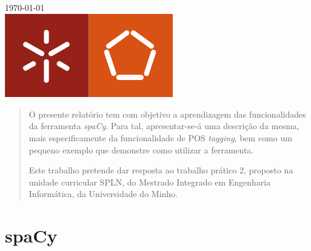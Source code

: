 \documentclass[12pt]{article}
\begin{document}
\begin{titlepage}
{\large \today}\\[1.5cm] %


\includegraphics[width=0.55\textwidth]{logo}\\[1cm] %
 

\vfill %

\end{titlepage}

\vspace{1.0cm}

\begin{abstract}
O presente relatório tem com objetivo a aprendizagem das funcionalidades da ferramenta \textit{spaCy}. Para tal, apresentar-se-á uma descrição da mesma, mais especificamente da
funcionalidade de POS \textit{tagging}, bem como um pequeno exemplo que demonstre como utilizar a ferramenta.

Este trabalho pretende dar resposta ao trabalho prático 2, proposto na unidade curricular SPLN, do Mestrado Integrado em Engenharia Informática, da Universidade do Minho.
\end{abstract}

\vspace{1.0cm}

\tableofcontents

\newpage

\let\oldref\ref
\renewcommand{\ref}[1]{\smash{\underline{\oldref{#1}}}}

\section{spaCy}
\end{document}
